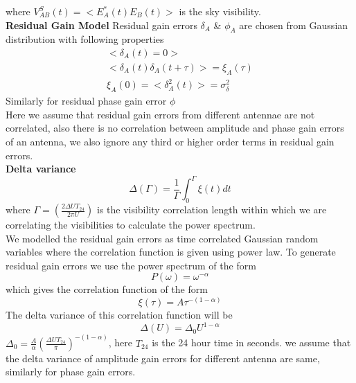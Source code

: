 \documentclass[fleqn,usenatbib]{mnras}
\begin{document}
where $V_{AB}^S(t) =<E^*_A(t)E_B(t)> $ is the sky visibility.\\
\textbf{Residual Gain Model}
Residual gain errors $\delta_A$ \& $\phi_A$ are chosen from Gaussian distribution with following properties
 \begin{equation}
 \begin{split}
     <\delta_A(t) = 0>\\<\delta_A(t) \delta_A(t+\tau)> = \xi_A(\tau)\\\xi_A(0) = <\delta^2_A(t)> = \sigma^2_{\delta}
 \end{split}
 \end{equation}
 Similarly for residual phase gain error $ \phi $\\
 Here we assume that residual gain errors from different antennae are not correlated, also there is no correlation between amplitude and phase gain errors of an antenna, we also ignore any third or higher order terms in residual gain errors.\\
 \textbf{Delta variance}
\begin{equation}
    \Delta(\Gamma) = \frac{1}{\Gamma} \int _0 ^{\Gamma} \xi (t) dt
\end{equation}
where $\Gamma = (\frac{2\Delta U T_{24}}{2\pi U})$ is the visibility correlation length within which we are correlating the visibilities to calculate the power spectrum.\\
We modelled the residual gain errors as time correlated Gaussian random variables where the correlation function is given using power law. To generate residual gain errors we use the power spectrum of the form
\begin{equation}
    P(\omega) = \omega ^{-\alpha}
\end{equation}
which gives the correlation function of the form
\begin{equation}
    \xi(\tau) = A\tau^{-(1-\alpha)}
\end{equation}
The delta variance of this correlation function will be
\begin{equation}
     \Delta(U) = \Delta_0 U^{1-\alpha}
\end{equation}
 $\Delta_0 = \frac{A}{\alpha} (\frac{\Delta U T_{24}}{\pi})^{-(1-\alpha)}$, here $T_{24}$ is the 24 hour time in seconds. 
 we assume that the delta variance of amplitude gain errors for different antenna are same, similarly for phase gain errors.\\
\end{document}
